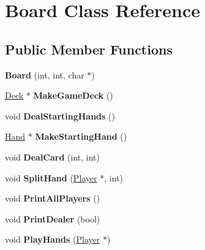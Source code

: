 \hypertarget{class_board}{}\section{Board Class Reference}
\label{class_board}
\subsection*{Public Member Functions}
\begin{DoxyCompactItemize}
\item 
{\bfseries Board} (int, int, char $\ast$)\hypertarget{class_board_ab9949f9a0330cab98490356319493b6d}{}\label{class_board_ab9949f9a0330cab98490356319493b6d}

\item 
\hyperlink{class_deck}{Deck} $\ast$ {\bfseries Make\+Game\+Deck} ()\hypertarget{class_board_a104f1b3d520ce28a2c8000979710ef1d}{}\label{class_board_a104f1b3d520ce28a2c8000979710ef1d}

\item 
void {\bfseries Deal\+Starting\+Hands} ()\hypertarget{class_board_a7a70fb73a8b8c638a3f93cf35f6a1e0a}{}\label{class_board_a7a70fb73a8b8c638a3f93cf35f6a1e0a}

\item 
\hyperlink{class_hand}{Hand} $\ast$ {\bfseries Make\+Starting\+Hand} ()\hypertarget{class_board_aaeb185da77be58edd10130b45a2852af}{}\label{class_board_aaeb185da77be58edd10130b45a2852af}

\item 
void {\bfseries Deal\+Card} (int, int)\hypertarget{class_board_ab9bf3b49f366c7b704d07688a6974078}{}\label{class_board_ab9bf3b49f366c7b704d07688a6974078}

\item 
void {\bfseries Split\+Hand} (\hyperlink{class_player}{Player} $\ast$, int)\hypertarget{class_board_af5fd0572e836460a3dbaca00928b89d7}{}\label{class_board_af5fd0572e836460a3dbaca00928b89d7}

\item 
void {\bfseries Print\+All\+Players} ()\hypertarget{class_board_aeb20716c3439b374c21bc7875e3fd92a}{}\label{class_board_aeb20716c3439b374c21bc7875e3fd92a}

\item 
void {\bfseries Print\+Dealer} (bool)\hypertarget{class_board_abb4069cf818d0f69e45a143b8200653d}{}\label{class_board_abb4069cf818d0f69e45a143b8200653d}

\item 
void {\bfseries Play\+Hands} (\hyperlink{class_player}{Player} $\ast$)\hypertarget{class_board_a97d21d0a6e7d0c298fb4188f3db01336}{}\label{class_board_a97d21d0a6e7d0c298fb4188f3db01336}


\end{DoxyCompactItemize}
